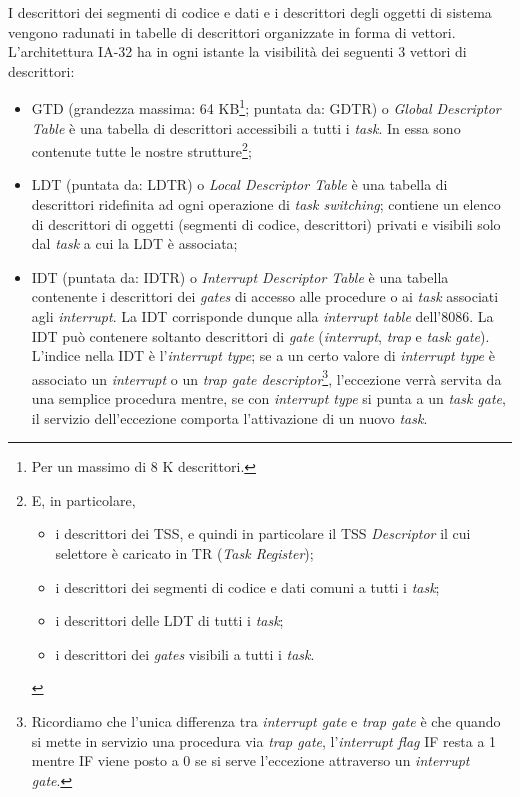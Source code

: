 I descrittori dei segmenti di codice e dati e i descrittori degli oggetti di sistema vengono radunati in
tabelle di descrittori organizzate in forma di vettori.
L'architettura IA-32 ha in ogni istante la visibilità dei seguenti 3 vettori di descrittori:
\begin{itemize}
\item  GTD (grandezza massima: 64 KB\footnote{Per un massimo di 8 K descrittori.}; puntata da: GDTR) o \textit{Global Descriptor Table} è una tabella di descrittori accessibili a tutti i \textit{task}. In essa sono contenute tutte le nostre strutture\footnote{E, in particolare,
\begin{itemize}
\item i descrittori dei TSS, e quindi in particolare il TSS \textit{Descriptor} il cui selettore è
caricato in TR (\textit{Task Register});
\item i descrittori dei segmenti di codice e dati comuni a tutti i \textit{task};
\item i descrittori delle LDT di tutti i \textit{task};
\item i descrittori dei \textit{gates} visibili a tutti i \textit{task}.
\end{itemize}};
\item  LDT (puntata da: LDTR) o \textit{Local Descriptor Table} è una tabella di descrittori ridefinita ad ogni operazione di \textit{task switching}; contiene un elenco di descrittori di oggetti (segmenti di codice, descrittori) privati e visibili solo dal \textit{task} a cui la LDT è associata;
\item  IDT (puntata da: IDTR) o \textit{Interrupt Descriptor Table} è una tabella contenente i descrittori dei \textit{gates} di accesso alle procedure o ai \textit{task} associati agli \textit{interrupt}. La IDT corrisponde dunque alla \textit{interrupt table} dell'8086. La IDT può contenere soltanto descrittori di \textit{gate} (\textit{interrupt}, \textit{trap} e \textit{task gate}). L'indice nella IDT è l'\textit{interrupt type}; se a un certo valore di \textit{interrupt type} è associato un \textit{interrupt} o un \textit{trap gate descriptor}\footnote{Ricordiamo che l'unica differenza tra \textit{interrupt gate} e \textit{trap gate} è che quando si mette in servizio una
procedura via \textit{trap gate}, l'\textit{interrupt flag} IF resta a 1 mentre IF viene posto a 0 se si serve
l'eccezione attraverso un \textit{interrupt gate}.}, l'eccezione verrà servita da una semplice procedura mentre, se con \textit{interrupt type} si punta a un \textit{task gate}, il servizio dell'eccezione comporta l'attivazione di un nuovo \textit{task}.
\end{itemize}

